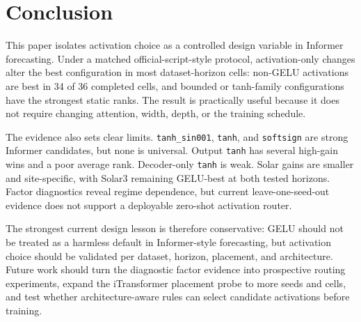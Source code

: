 \section{Conclusion}

This paper isolates activation choice as a controlled design variable in Informer forecasting. Under a matched official-script-style protocol, activation-only changes alter the best configuration in most dataset-horizon cells: non-GELU activations are best in 34 of 36 completed cells, and bounded or tanh-family configurations have the strongest static ranks. The result is practically useful because it does not require changing attention, width, depth, or the training schedule.

The evidence also sets clear limits. \texttt{tanh\_sin001}, \texttt{tanh}, and \texttt{softsign} are strong Informer candidates, but none is universal. Output \texttt{tanh} has several high-gain wins and a poor average rank. Decoder-only \texttt{tanh} is weak. Solar gains are smaller and site-specific, with Solar3 remaining GELU-best at both tested horizons. Factor diagnostics reveal regime dependence, but current leave-one-seed-out evidence does not support a deployable zero-shot activation router.

The strongest current design lesson is therefore conservative: GELU should not be treated as a harmless default in Informer-style forecasting, but activation choice should be validated per dataset, horizon, placement, and architecture. Future work should turn the diagnostic factor evidence into prospective routing experiments, expand the iTransformer placement probe to more seeds and cells, and test whether architecture-aware rules can select candidate activations before training.
